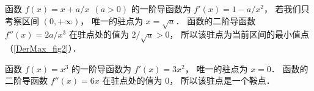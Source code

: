 \begin{exam}{}\label{DerMax_ex2}
函数 $f(x) = x+a/x \ \ (a > 0)$ 的一阶导函数为 $f'(x) = 1 - a/x^2$， 若我们只考察区间 $(0, +\infty)$， 唯一的驻点为 $x = \sqrt{a}$． 函数的二阶导函数 $f''(x) = 2a/x^3$ 在驻点处的值为 $2/\sqrt{a} > 0$， 所以该驻点为当前区间的最小值点（\autoref{DerMax_fig2}）．
\end{exam}

\begin{exam}{}\label{DerMax_ex3}
函数 $f(x) = x^3$ 的一阶导函数为 $f'(x) = 3x^2$， 唯一的驻点为 $x = 0$． 函数的二阶导函数 $f''(x) = 6x$ 在驻点处的值为 $0$， 所以该驻点是一个鞍点．
\end{exam}











